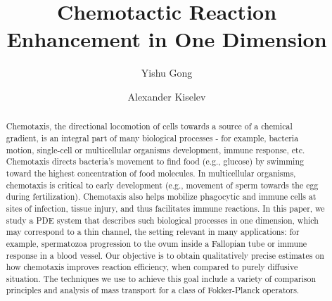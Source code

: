 \documentclass[12pt,reqno]{amsart}
\title{Chemotactic Reaction Enhancement in One Dimension}
\author{Yishu Gong}
\author{Alexander Kiselev}
\begin{document}
\begin{abstract}
Chemotaxis, the directional locomotion of cells towards a source of a chemical gradient, is an integral part of many biological processes - for example, bacteria motion, single-cell or multicellular organisms development, immune response, etc. Chemotaxis directs bacteria's movement to find food (e.g., glucose) by swimming toward the highest concentration of food molecules. In multicellular organisms, chemotaxis is critical to early development (e.g., movement of sperm towards the egg during fertilization). Chemotaxis also helps mobilize phagocytic and immune cells at sites of infection, tissue injury, and thus facilitates immune reactions. In this paper, we study a PDE system that describes such biological processes in one dimension, which may correspond to a thin channel, the setting relevant in many applications: for example,
spermatozoa progression to the ovum inside a Fallopian tube or immune response in a blood vessel.
Our objective is to obtain qualitatively precise estimates on how chemotaxis improves reaction efficiency,
when compared to purely diffusive situation. The techniques we use to achieve this goal include a variety of comparison principles and analysis of mass transport for a class of Fokker-Planck operators.
\end{abstract}
\maketitle
\end{document}

